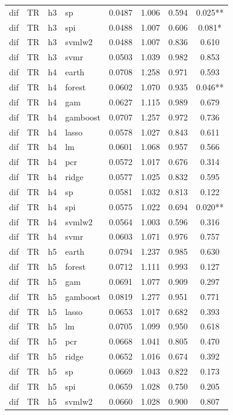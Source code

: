 \begin{ThreePartTable}
\begin{longtable}[t]{llclcccc}
dif & TR & h3 & sp & 0.0487 & 1.006 & 0.594 & 0.025**\\
dif & TR & h3 & spi & 0.0488 & 1.007 & 0.606 & 0.081*\\
dif & TR & h3 & svmlw2 & 0.0488 & 1.007 & 0.836 & 0.610\\
dif & TR & h3 & svmr & 0.0503 & 1.039 & 0.982 & 0.853\\
\addlinespace
dif & TR & h4 & earth & 0.0708 & 1.258 & 0.971 & 0.593\\
dif & TR & h4 & forest & 0.0602 & 1.070 & 0.935 & 0.046**\\
dif & TR & h4 & gam & 0.0627 & 1.115 & 0.989 & 0.679\\
dif & TR & h4 & gamboost & 0.0707 & 1.257 & 0.972 & 0.736\\
dif & TR & h4 & lasso & 0.0578 & 1.027 & 0.843 & 0.611\\
dif & TR & h4 & lm & 0.0601 & 1.068 & 0.957 & 0.566\\
dif & TR & h4 & pcr & 0.0572 & 1.017 & 0.676 & 0.314\\
dif & TR & h4 & ridge & 0.0577 & 1.025 & 0.832 & 0.595\\
dif & TR & h4 & sp & 0.0581 & 1.032 & 0.813 & 0.122\\
dif & TR & h4 & spi & 0.0575 & 1.022 & 0.694 & 0.020**\\
dif & TR & h4 & svmlw2 & 0.0564 & 1.003 & 0.596 & 0.316\\
dif & TR & h4 & svmr & 0.0603 & 1.071 & 0.976 & 0.757\\
\addlinespace
dif & TR & h5 & earth & 0.0794 & 1.237 & 0.985 & 0.630\\
dif & TR & h5 & forest & 0.0712 & 1.111 & 0.993 & 0.127\\
dif & TR & h5 & gam & 0.0691 & 1.077 & 0.909 & 0.297\\
dif & TR & h5 & gamboost & 0.0819 & 1.277 & 0.951 & 0.771\\
dif & TR & h5 & lasso & 0.0653 & 1.017 & 0.682 & 0.393\\
dif & TR & h5 & lm & 0.0705 & 1.099 & 0.950 & 0.618\\
dif & TR & h5 & pcr & 0.0668 & 1.041 & 0.805 & 0.470\\
dif & TR & h5 & ridge & 0.0652 & 1.016 & 0.674 & 0.392\\
dif & TR & h5 & sp & 0.0669 & 1.043 & 0.822 & 0.173\\
dif & TR & h5 & spi & 0.0659 & 1.028 & 0.750 & 0.205\\
dif & TR & h5 & svmlw2 & 0.0660 & 1.028 & 0.900 & 0.807\\

\end{longtable}
\end{ThreePartTable}
